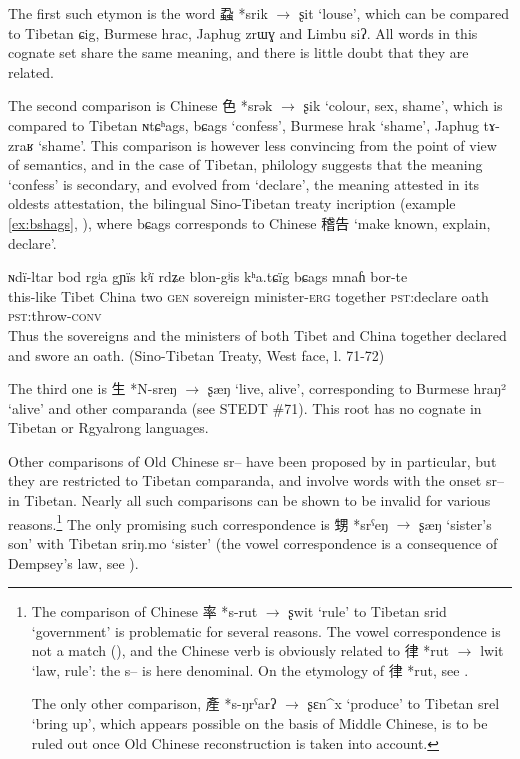 \documentclass[oldfontcommands,oneside,a4paper,11pt]{article}
\newcommand{\ipa}[1]{{\phon #1}} %
\newcommand{\zh}[1]{{\cn #1}}
\newcommand{\archaic}[4]{\zh{#1} *\ipa{#2} $\rightarrow$ \ipa{#3} `#4'}
\begin{document}
The first such etymon is the word \archaic{蝨}{srik}{ʂit}{louse}, which can be compared to Tibetan \ipa{ɕig}, Burmese \ipa{hrac}, Japhug \ipa{zrɯɣ} and Limbu \ipa{siʔ}. All words in this cognate set share the same meaning, and there is little doubt that they are related.

The second comparison is Chinese \archaic{色}{srək}{ʂik}{colour, sex, shame}, which is compared to Tibetan \ipa{ɴtɕʰags}, \ipa{bɕags} `confess', Burmese \ipa{hrak} `shame', Japhug \ipa{tɤ-zraʁ} `shame'. This comparison is however less convincing from the point of view of semantics, and in the case of Tibetan, philology suggests that the meaning `confess' is secondary, and evolved from `declare', the meaning attested in its oldests attestation, the bilingual Sino-Tibetan treaty incription (example \ref{ex:bshags}, \citealt[40,80]{licoblin87}), where 	\ipa{bɕags} corresponds to Chinese \zh{稽告} `make known, explain, declare'.


\begin{exe}
\ex \label{ex:bshags}
\gll
\ipa{ɴdï-ltar} 	\ipa{bod} 	\ipa{rgʲa} 	\ipa{gɲïs} 	\ipa{kʲï} 	\ipa{rdʑe} \ipa{blon-gʲis} 	\ipa{kʰa.tɕïg} 	\ipa{bɕags} 	\ipa{mnaɦ} 	\ipa{bor-te} \\
this-like Tibet China two \textsc{gen} sovereign minister-\textsc{erg} together \textsc{pst}:declare oath \textsc{pst}:throw-\textsc{conv} \\
\glt Thus the sovereigns and the ministers of both Tibet and China together declared and swore an oath. (Sino-Tibetan Treaty, West face, l. 71-72)
\end{exe}

The third one is \archaic{生}{N-sreŋ}{ʂæŋ}{live, alive}, corresponding to Burmese \ipa{hraŋ²} `alive' and other comparanda (see STEDT \#71). This root has no cognate in Tibetan or Rgyalrong languages.

Other comparisons of Old Chinese \ipa{*sr--} have been proposed by \citet{coblin86handlist} in particular, but they are restricted to Tibetan comparanda, and involve words with the onset \ipa{sr--} in Tibetan. Nearly all such comparisons can be shown to be invalid for various reasons.\footnote{The comparison of Chinese \archaic{率}{s-rut}{ʂwit}{rule} to Tibetan \ipa{srid} `government' is problematic for several reasons. The vowel correspondence is not a match (\citealt{gong95st}), and the Chinese verb is obviously related to \archaic{律}{rut}{lwit}{law, rule}: the \ipa{s--} is here denominal. On the etymology of \zh{律} *\ipa{rut}, see \citet{sagart14lv}.

The only other comparison, \archaic{產}{s-ŋrˁarʔ}{ʂɛn^x}{produce} to Tibetan \ipa{srel} `bring up', which appears possible on the basis of Middle Chinese, is to be ruled out once Old Chinese reconstruction is taken into account.
}
The only promising such correspondence is \archaic{甥}{srˁeŋ}{ʂæŋ}{sister's son} with Tibetan \ipa{sriŋ.mo} `sister' (the vowel correspondence is a consequence of Dempsey's law, see \citealt{hill14dempsey}).
\end{document}
